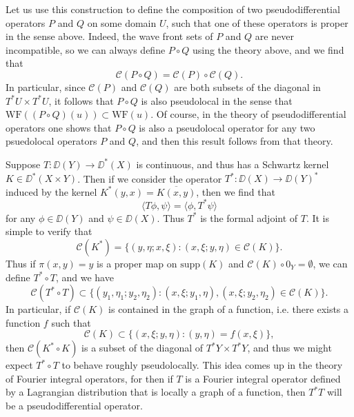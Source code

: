 \begin{example}
    Let us use this construction to define the composition of two pseudodifferential operators $P$ and $Q$ on some domain $U$, such that one of these operators is proper in the sense above. Indeed, the wave front sets of $P$ and $Q$ are never incompatible, so we can always define $P \circ Q$ using the theory above, and we find that
    \[ \mathcal{C}(P \circ Q) = \mathcal{C}(P) \circ \mathcal{C}(Q). \]
    In particular, since $\mathcal{C}(P)$ and $\mathcal{C}(Q)$ are both subsets of the diagonal in $T^*U \times T^*U$, it follows that $P \circ Q$ is also pseudolocal in the sense that $\text{WF}((P \circ Q)(u)) \subset \text{WF}(u)$. Of course, in the theory of pseudodifferential operators one shows that $P \circ Q$ is also a pseudolocal operator for any two psuedolocal operators $P$ and $Q$, and then this result follows from that theory.
\end{example}

\begin{example}
    Suppose $T: \DD(Y) \to \DD^*(X)$ is continuous, and thus has a Schwartz kernel $K \in \DD^*(X \times Y)$. Then if we consider the operator $T^*: \DD(X) \to \DD(Y)^*$ induced by the kernel $K^*(y,x) = \overline{K(x,y)}$, then we find that
    \[ \langle T\phi, \psi \rangle = \langle \phi, T^* \psi \rangle \]
    for any $\phi \in \DD(Y)$ and $\psi \in \DD(X)$. Thus $T^*$ is the formal adjoint of $T$. It is simple to verify that
    \[ \mathcal{C}(K^*) = \{ (y,\eta; x, \xi) : (x,\xi;y,\eta) \in \mathcal{C}(K) \}. \]
    Thus if $\pi(x,y) = y$ is a proper map on $\text{supp}(K)$ and $\mathcal{C}(K) \circ 0_Y = \emptyset$, we can define $T^* \circ T$, and we have
    \[ \mathcal{C}(T^* \circ T) \subset \{ (y_1,\eta_1;y_2,\eta_2) : (x,\xi;y_1,\eta), (x,\xi;y_2,\eta_2) \in \mathcal{C}(K) \}. \]
    In particular, if $\mathcal{C}(K)$ is contained in the graph of a function, i.e. there exists a function $f$ such that
    \[ \mathcal{C}(K) \subset \{ (x,\xi;y,\eta) : (y,\eta) = f(x,\xi) \}, \]
    then $\mathcal{C}(K^* \circ K)$ is a subset of the diagonal of $T^* Y \times T^* Y$, and thus we might expect $T^* \circ T$ to behave roughly pseudolocally. This idea comes up in the theory of Fourier integral operators, for then if $T$ is a Fourier integral operator defined by a Lagrangian distribution that is locally a graph of a function, then $T^* T$ will be a pseudodifferential operator.
\end{example}










